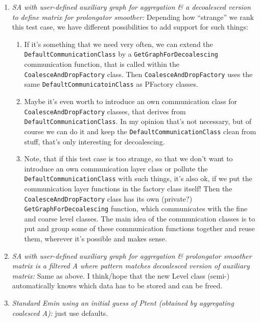 \begin{enumerate}
\item \textit{SA with user-defined auxiliary graph for aggregation \& a decoalesced version to define matrix for prolongator smoother:} Depending how ``strange'' we rank this test case, we have different possibilities to add support for such things:
\begin{enumerate}
\item If it's something that we need very often, we can extend the \verb|DefaultCommunicationClass| by a \verb|GetGraphForDecoalescing| communication function, that is called within the \verb|CoalesceAndDropFactory| class. Then \verb|CoalesceAndDropFactory| uses the same \verb|DefaultCommunicatoinClass| as PFactory classes.
\item Maybe it's even worth to introduce an own communication class for \verb|CoalesceAndDropFactory| classes, that derives from \verb|DefaultCommunicationClass|. In my opinion that's not necessary, but of course we can do it and keep the \verb|DefaultCommunicationClass| clean from stuff, that's only interesting for decoalescing.
\item Note, that if this test case is too strange, so that we don't want to introduce an own communication layer class or pollute the \verb|DefaultCommunicationClass| with such things, it's also ok, if we put the communication layer functions in the factory class itself! Then the \verb|CoalesceAndDropFactory| class has its own (private?) \verb|GetGraphForDecoalescing| function, which communicates with the fine and coarse level classes. The main idea of the communication classes is to put and group some of these communication functions together and reuse them, wherever it's possible and makes sense.
\end{enumerate}
\item \textit{SA with user-defined auxiliary graph for aggregation \& prolongator smoother matrix is a filtered A where pattern matches decoalesced version of auxiliary matrix:} Same as above. I think/hope that the new Level class (semi-) automatically knows which data has to be stored and can be freed.
\item \textit{Standard Emin using an initial guess of \textit{Ptent} (obtained by aggregating coalesced A):} just use defaults.

\end{enumerate}
